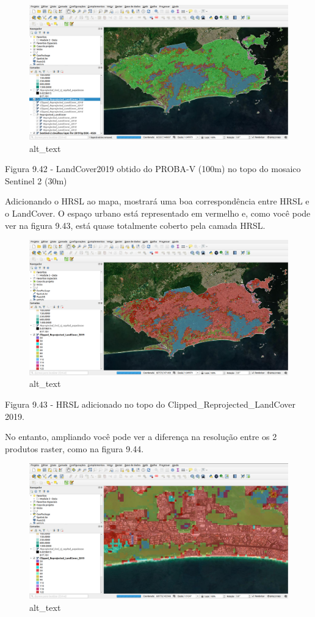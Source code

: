 \documentclass[
  portuguese,
]{krantz}
\begin{document}
\begin{figure}
\centering
\includegraphics{media/modulo9/fig942.png}
\caption{alt\_text}
\end{figure}

Figura 9.42 - LandCover2019 obtido do PROBA-V (100m) no topo do mosaico Sentinel 2 (30m)

Adicionando o HRSL ao mapa, mostrará uma boa correspondência entre HRSL e o LandCover. O espaço urbano está representado em vermelho e, como você pode ver na figura 9.43, está quase totalmente coberto pela camada HRSL.

\begin{figure}
\centering
\includegraphics{media/modulo9/fig943.png}
\caption{alt\_text}
\end{figure}

Figura 9.43 - HRSL adicionado no topo do Clipped\_Reprojected\_LandCover 2019.

No entanto, ampliando você pode ver a diferença na resolução entre os 2 produtos raster, como na figura 9.44.

\begin{figure}
\centering
\includegraphics{media/modulo9/fig944.png}
\caption{alt\_text}
\end{figure}
\end{document}
